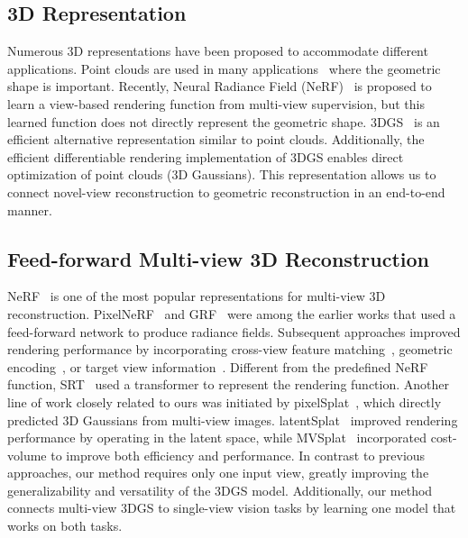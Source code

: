 \documentclass{article} %
\begin{document}
\subsection{3D Representation}
Numerous 3D representations have been proposed to accommodate different applications. Point clouds are used in many applications~\citep{ullman1979interpretation,schoenberger2016sfm,nichol2022point} where the geometric shape is important. Recently, Neural Radiance Field (NeRF)~\citep{mildenhall2021nerf} is proposed to learn a view-based rendering function from multi-view supervision, but this learned function does not directly represent the geometric shape. 3DGS~\citep{kerbl20233d} is an efficient alternative representation similar to point clouds. Additionally, the efficient differentiable rendering implementation of 3DGS enables direct optimization of point clouds (3D Gaussians). This representation allows us to connect novel-view reconstruction to geometric reconstruction in an end-to-end manner.

\subsection{Feed-forward Multi-view 3D Reconstruction}
NeRF~\citep{mildenhall2021nerf} is one of the most popular representations for multi-view 3D reconstruction. PixelNeRF~\citep{yu2021pixelnerf} and GRF~\citep{trevithick2021grf} were among the earlier works that used a feed-forward network to produce radiance fields. Subsequent approaches improved rendering performance by incorporating cross-view feature matching~\citep{chen2021mvsnerf,chen2023explicit,du2023learning}, geometric encoding~\citep{miyato2023gta}, or target view information~\citep{xu2024murf}. Different from the predefined NeRF function, SRT~\citep{sajjadi2022scene} used a transformer to represent the rendering function. Another line of work closely related to ours was initiated by pixelSplat~\citep{charatan2024pixelsplat}, which directly predicted 3D Gaussians from multi-view images. latentSplat~\citep{wewer2024latentsplat} improved rendering performance by operating in the latent space, while MVSplat~\citep{chen2024mvsplat} incorporated cost-volume to improve both efficiency and performance. In contrast to previous approaches, our method requires only one input view, greatly improving the generalizability and versatility of the 3DGS model. Additionally, our method connects multi-view 3DGS to single-view vision tasks by learning one model that works on both tasks.
\end{document}

